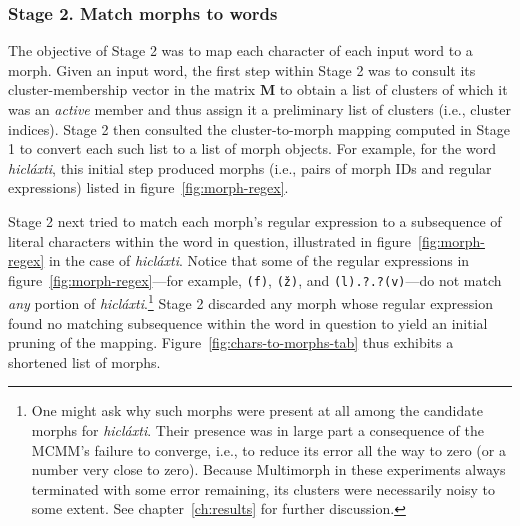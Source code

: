 {\subsubsection{Stage 2. Match morphs to words}
 
The objective of Stage 2 was to map each character of each input word to a morph.
Given an input word, the first step within Stage 2 was to consult its 
cluster-membership vector in the matrix $\mathbf{M}$ to obtain a list of clusters
of which it was an \emph{active} member and thus assign it a preliminary list 
of clusters (i.e., cluster indices).  
Stage 2 then consulted the cluster-to-morph mapping computed in 
Stage 1 to convert each such list to a list of morph objects.
For example, for the word \textit{hicl\'{a}xti},
this initial step produced %
morphs (i.e., pairs of morph IDs and regular expressions)  listed in 
figure~\ref{fig:morph-regex}. %


Stage 2 next tried to match each morph's regular expression to a subsequence of
literal characters within the word in question, 
illustrated in figure~\ref{fig:morph-regex}
in the case of \textit{hicl\'{a}xti}. 
Notice that some of the regular expressions in figure~\ref{fig:morph-regex}---for example,
\texttt{(f)}, \texttt{(\v{z})}, and \texttt{(l).?.?(v)}---do not
match \emph{any} portion of \textit{hicl\'{a}xti}.\footnote{One might ask 
why such morphs were present at all among the 
candidate morphs for \textit{hicl\'{a}xti}.  Their presence was in large part a 
consequence of the MCMM's failure to converge, i.e., to reduce its error all the 
way to zero (or a number very close to zero). Because Multimorph in these 
experiments always terminated with some error remaining, its clusters 
were necessarily noisy to some extent. See chapter~\ref{ch:results} for 
further discussion.}
Stage 2 discarded any morph whose regular expression found no matching subsequence 
within the word in question to yield an initial pruning of the mapping.  
Figure~\ref{fig:chars-to-morphs-tab} thus exhibits a shortened list of morphs.

}
